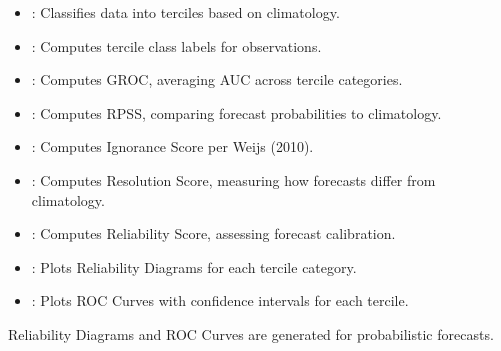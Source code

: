 \documentclass[letterpaper,10pt,english]{sphinxmanual}
\begin{document}
\sphinxAtStartPar
{}
\begin{itemize}
\item {} 
\sphinxAtStartPar
{}: Classifies data into terciles based on climatology.

\item {} 
\sphinxAtStartPar
{}: Computes tercile class labels for observations.

\item {} 
\sphinxAtStartPar
{}: Computes GROC, averaging AUC across tercile categories.

\item {} 
\sphinxAtStartPar
{}: Computes RPSS, comparing forecast probabilities to climatology.

\item {} 
\sphinxAtStartPar
{}: Computes Ignorance Score per Weijs (2010).

\item {} 
\sphinxAtStartPar
{}: Computes Resolution Score, measuring how forecasts differ from climatology.

\item {} 
\sphinxAtStartPar
{}: Computes Reliability Score, assessing forecast calibration.

\item {} 
\sphinxAtStartPar
{}: Plots Reliability Diagrams for each tercile category.

\item {} 
\sphinxAtStartPar
{}: Plots ROC Curves with confidence intervals for each tercile.

\end{itemize}

\sphinxAtStartPar
{}

\sphinxAtStartPar
Reliability Diagrams and ROC Curves are generated for probabilistic forecasts.
\end{document}
